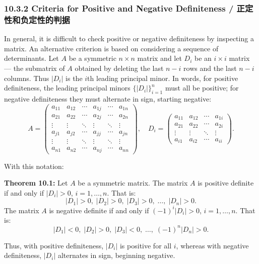 \subsubsection{10.3.2 Criteria for Positive and Negative Definiteness / 正定性和负定性的判据}

\begin{original}
In general, it is difficult to check positive or negative definiteness by inspecting a matrix. An alternative criterion is based on considering a sequence of determinants. Let $A$ be a symmetric $n \times n$ matrix and let $D_i$ be an $i \times i$ matrix --- the submatrix of $A$ obtained by deleting the last $n-i$ rows and the last $n-i$ columns. Thus $|D_i|$ is the $i$th leading principal minor. In words, for positive definiteness, the leading principal minors $\{|D_i|\}_{i=1}^n$ must all be positive; for negative definiteness they must alternate in sign, starting negative:
\[
A =
\begin{pmatrix}
a_{11} & a_{12} & \cdots & a_{1j} & \cdots & a_{1n} \\
a_{21} & a_{22} & \cdots & a_{2j} & \cdots & a_{2n} \\
\vdots & \vdots & \ddots & \vdots & \ddots & \vdots \\
a_{j1} & a_{j2} & \cdots & a_{jj} & \cdots & a_{jn} \\
\vdots & \vdots & \ddots & \vdots & \ddots & \vdots \\
a_{n1} & a_{n2} & \cdots & a_{nj} & \cdots & a_{nn}
\end{pmatrix},
\quad
D_i =
\begin{pmatrix}
a_{11} & a_{12} & \cdots & a_{1i} \\
a_{21} & a_{22} & \cdots & a_{2i} \\
\vdots & \vdots & \ddots & \vdots \\
a_{i1} & a_{i2} & \cdots & a_{ii}
\end{pmatrix}.
\]

With this notation:

\textbf{Theorem 10.1:} Let $A$ be a symmetric matrix.
The matrix $A$ is positive definite if and only if $|D_i| > 0$, $i = 1,\ldots,n$. That is:
\[
|D_1| > 0,\; |D_2| > 0,\; |D_3| > 0,\; \ldots,\; |D_n| > 0.
\]
The matrix $A$ is negative definite if and only if $(-1)^i|D_i| > 0$, $i = 1,\ldots,n$. That is:
\[
|D_1| < 0,\; |D_2| > 0,\; |D_3| < 0,\; \ldots,\; (-1)^n|D_n| > 0.
\]

Thus, with positive definiteness, $|D_i|$ is positive for all $i$, whereas with negative definiteness, $|D_i|$ alternates in sign, beginning negative.
\end{original}
